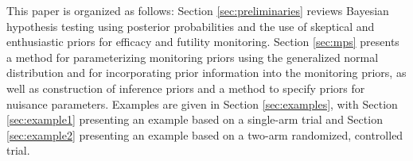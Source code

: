\documentclass[AMA,STIX1COL,doublespace]{WileyNJD-v2}
\begin{document}
This paper is organized as follows: %
Section \ref{sec:preliminaries} reviews Bayesian hypothesis testing using posterior probabilities and the use of  skeptical and enthusiastic priors for efficacy and futility monitoring. 
%
Section \ref{sec:mps} presents a method for parameterizing monitoring priors using the generalized normal distribution and for incorporating prior information into the monitoring priors, as well as construction of inference priors and a method to specify priors for nuisance parameters.
%
Examples are given in Section \ref{sec:examples}, with Section \ref{sec:example1} presenting an example based on a single-arm trial and Section \ref{sec:example2} presenting an example based on a two-arm randomized, controlled trial.
\end{document}
